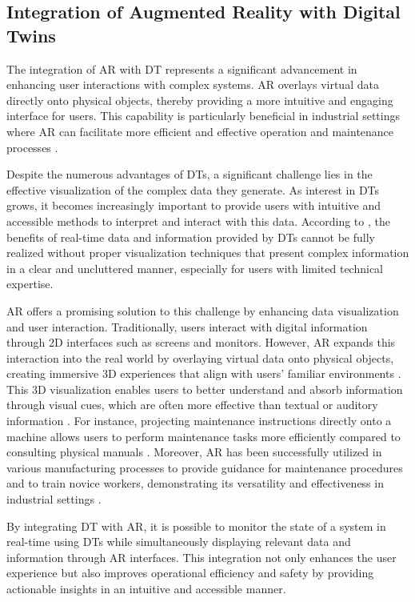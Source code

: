 \subsection{Integration of Augmented Reality with Digital Twins}
The integration of \ac{AR} with \ac{DT} represents a significant advancement in enhancing user interactions with complex systems. 
\ac{AR} overlays virtual data directly onto physical objects, thereby providing a more intuitive and engaging interface for users. 
This capability is particularly beneficial in industrial settings where \ac{AR} can facilitate more efficient and effective operation and 
maintenance processes \cite{article12, peddie2017augmented}.

Despite the numerous advantages of \ac{DT}s, a significant challenge lies in the effective visualization of the complex data they generate. 
As interest in \ac{DT}s grows, it becomes increasingly important to provide users with intuitive and accessible methods to interpret and interact 
with this data. According to \cite{article12}, the benefits of real-time data and information provided by \ac{DT}s cannot be fully realized without 
proper visualization techniques that present complex information in a clear and uncluttered manner, especially for users with limited technical expertise.

\ac{AR} offers a promising solution to this challenge by enhancing data visualization and user interaction. Traditionally, users interact with digital 
information through 2D interfaces such as screens and monitors. However, \ac{AR} expands this interaction into the real world by overlaying virtual 
data onto physical objects, creating immersive 3D experiences that align with users' familiar environments \cite{peddie2017augmented}. This 3D visualization enables
users to better understand and absorb information through visual cues, which are often more effective than textual or auditory information \cite{article-teaching}.
For instance, projecting maintenance instructions directly onto a machine allows users to perform maintenance tasks more efficiently compared to 
consulting physical manuals \cite{inproceedings}. Moreover, \ac{AR} has been successfully utilized in various manufacturing processes to provide guidance 
for maintenance procedures and to train novice workers, demonstrating its versatility and effectiveness in industrial settings \cite{ong2004virtual}.

By integrating \ac{DT} with \ac{AR}, it is possible to monitor the state of a system in real-time using \ac{DT}s while simultaneously displaying relevant
data and information through \ac{AR} interfaces. This integration not only enhances the user experience but also improves operational efficiency and 
safety by providing actionable insights in an intuitive and accessible manner.

